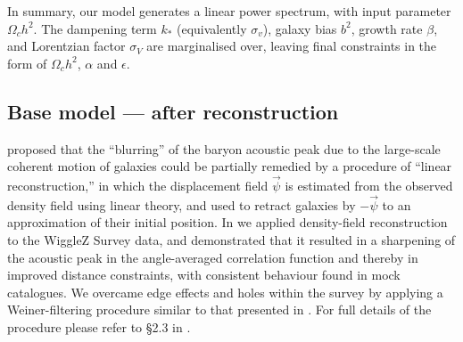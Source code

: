 \documentclass[iop,twocolappendix]{emulateapj}
\begin{document}





In summary, our model generates a linear power spectrum, with input parameter $\Omega_c h^2$. The dampening term $k_*$ (equivalently $\sigma_v$), galaxy bias $b^2$, growth rate $\beta$, and Lorentzian factor $\sigma_V$ are marginalised over, leaving final constraints in the form of $\Omega_c h^2$, $\alpha$ and $\epsilon$. %



\subsection{Base model --- after reconstruction}

\citet{EisensteinSeoSirko2007} proposed that the ``blurring'' of the baryon
acoustic peak due to the large-scale coherent motion of galaxies could
be partially remedied by a procedure of ``linear reconstruction,'' in
which the displacement field $\vec{\psi}$ is estimated from the
observed density field using linear theory, and used to retract
galaxies by $-\vec{\psi}$ to an approximation of their initial
position.  In \citet{KazinKoda2014} we applied density-field
reconstruction to the WiggleZ Survey data, and demonstrated that it
resulted in a sharpening of the acoustic peak in the angle-averaged
correlation function and thereby in improved distance constraints,
with consistent behaviour found in mock catalogues.  We overcame edge
effects and holes within the survey by applying a Weiner-filtering
procedure similar to that presented in \citet{PadmanabhanXuEisenstein2012}.  For
full details of the procedure please refer to \S 2.3 in
\cite{KazinKoda2014}.
\end{document}

